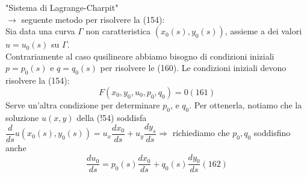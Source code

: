 \documentclass[a4paper,11pt]{report}
\begin{document}
"Sistema di Lagrange-Charpit"\\
$\rightarrow$ seguente metodo per risolvere la (154):\\
Sia data una curva $\Gamma$ non caratteristica $(x_0(s),y_0(s))$, assieme a dei valori $u=u_0(s)$ su $\Gamma$.\\
Contrariamente al caso qusilineare abbiamo bisogno di condizioni iniziali $p=p_0(s)$ e $q=q_0(s)$ per risolvere le (160). Le condizioni iniziali devono risolvere la (154): 
\begin{equation}
F(x_0,y_0,u_0,p_0,q_0)=0 (161)
\end{equation}
Serve un'altra condizione per determinare $p_0$, e $q_0$. Per ottenerla, notiamo che la soluzione $u(x,y)$ della (!54) soddisfa $\dfrac{d}{ds}u(x_0(s), y_0(s))=u_x\dfrac{dx_0}{ds}+u_y\dfrac{dy_s}{ds} \Rightarrow$ richiediamo che $p_0, q_0$ soddisfino anche
\begin{equation}
\dfrac{du_0}{ds}=p_0(s)\dfrac{dx_0}{ds}+ q_0(s)\dfrac{dy_0}{ds} (162)
\end{equation}
\end{document}

